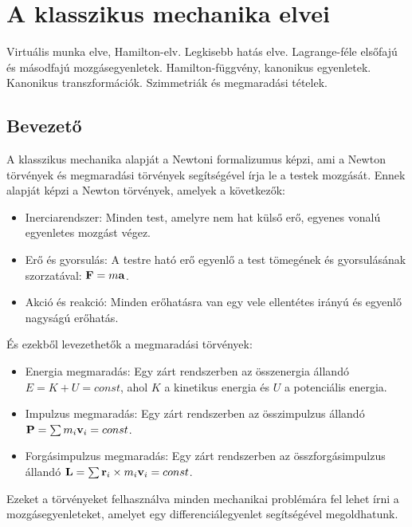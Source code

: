 \documentclass[a4paper,12pt]{article}
\begin{document}
\newpage
\section{A klasszikus mechanika elvei \cite{susskind}}

Virtuális munka elve, Hamilton-elv. Legkisebb hatás elve. Lagrange-féle elsőfajú és másodfajú mozgásegyenletek. Hamilton-függvény, kanonikus egyenletek. Kanonikus transzformációk. Szimmetriák és megmaradási tételek.

\subsection{Bevezető}
A klasszikus mechanika alapját a Newtoni formalizumus képzi, ami a Newton törvények és megmaradási törvények segítségével írja le a testek mozgását. Ennek alapját képzi a Newton törvények, amelyek a következők:
\begin{itemize}
    \item Inerciarendszer: Minden test, amelyre nem hat külső erő, egyenes vonalú egyenletes mozgást végez.
    \item Erő és gyorsulás: A testre ható erő egyenlő a test tömegének és gyorsulásának szorzatával: $\bold{F} = m \bold{a}$.
    \item Akció és reakció: Minden erőhatásra van egy vele ellentétes irányú és egyenlő nagyságú erőhatás.
\end{itemize}
És ezekből levezethetők a megmaradási törvények:
\begin{itemize}
    \item Energia megmaradás: Egy zárt rendszerben az összenergia állandó $E = K + U = const$, ahol $K$ a kinetikus energia és $U$ a potenciális energia.
    \item Impulzus megmaradás: Egy zárt rendszerben az összimpulzus állandó $\bold{P} = \sum m_i \bold{v}_i = const$.
    \item Forgásimpulzus megmaradás: Egy zárt rendszerben az összforgásimpulzus állandó $\bold{L} = \sum \bold{r}_i \times m_i \bold{v}_i = const$.
\end{itemize}
Ezeket a törvényeket felhasználva minden mechanikai problémára fel lehet írni a mozgásegyenleteket, amelyet egy differenciálegyenlet segítségével megoldhatunk.
\end{document}
